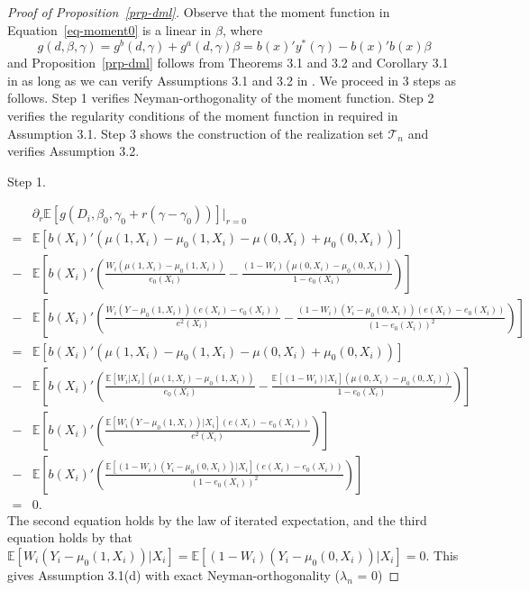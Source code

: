 \documentclass[
  12pt,
  12pt]{article}
\numberwithin{equation}{section}
\theoremstyle{definition}
\theoremstyle{plain}
\theoremstyle{plain}
\theoremstyle{remark}
\begin{document}
\begin{proof}[Proof of Proposition~\ref{prp-dml}]
Observe that the moment function in Equation~\ref{eq-moment0} is a
linear in \(\beta\), where \[
g(d, \beta, \gamma) = g^b(d, \gamma) + g^a(d, \gamma)\beta = b(x)'y^*(\gamma) - b(x)'b(x)\beta
\] and Proposition~\ref{prp-dml} follows from Theorems 3.1 and 3.2 and
Corollary 3.1 in \citet{chernozhukov2018double} as long as we can verify
Assumptions 3.1 and 3.2 in \citet{chernozhukov2018double}. We proceed in
3 steps as follows. Step 1 verifies Neyman-orthogonality of the moment
function. Step 2 verifies the regularity conditions of the moment
function in required in Assumption 3.1. Step 3 shows the construction of
the realization set \(\mathcal{T}_n\) and verifies Assumption 3.2.

Step 1.

\[
\begin{aligned}
&\partial_r \mathbb{E}[g(D_i, \beta_0, \gamma_0 + r(\gamma - \gamma_0))]\vert_{r = 0} \\
= & \mathbb{E}[b(X_i)'(\mu(1, X_i) - \mu_0(1, X_i) - \mu(0, X_i) + \mu_0(0, X_i))] \\
- &\mathbb{E}\left[b(X_i)'\left(\frac{W_i(\mu(1, X_i) - \mu_0(1, X_i))}{e_0(X_i)} - \frac{(1 - W_i)(\mu(0, X_i) - \mu_0(0, X_i))}{1 - e_0(X_i)}\right)\right] \\
- &\mathbb{E}\left[b(X_i)'\left(\frac{W_i(Y - \mu_0(1, X_i))(e(X_i) - e_0(X_i))}{e^2(X_i)} - \frac{(1 - W_i)(Y_i - \mu_0(0, X_i))(e(X_i) - e_0(X_i))}{(1 - e_0(X_i))^2}\right)\right] \\
= & \mathbb{E}[b(X_i)'(\mu(1, X_i) - \mu_0(1, X_i) - \mu(0, X_i) + \mu_0(0, X_i))] \\
- &\mathbb{E}\left[b(X_i)'\left(\frac{\mathbb{E}[W_i|X_i](\mu(1, X_i) - \mu_0(1, X_i))}{e_0(X_i)} - \frac{\mathbb{E}[(1 - W_i)|X_i](\mu(0, X_i) - \mu_0(0, X_i))}{1 - e_0(X_i)}\right)\right] \\
- &\mathbb{E}\left[b(X_i)'\left(\frac{\mathbb{E}[W_i(Y - \mu_0(1, X_i))|X_i](e(X_i) - e_0(X_i))}{e^2(X_i)}\right)\right] \\
- &\mathbb{E}\left[b(X_i)'\left(\frac{\mathbb{E}[(1 - W_i)(Y_i - \mu_0(0, X_i))|X_i](e(X_i) - e_0(X_i))}{(1 - e_0(X_i))^2}\right)\right] \\
= &0.
\end{aligned}
\] The second equation holds by the law of iterated expectation, and the
third equation holds by that
\(\mathbb{E}[W_i(Y_i - \mu_0(1, X_i))|X_i] = \mathbb{E}[(1 - W_i)(Y_i - \mu_0(0, X_i))|X_i] = 0\).
This gives Assumption 3.1(d) with exact Neyman-orthogonality
(\(\lambda_n\) = 0)


\end{proof}
\end{document}
